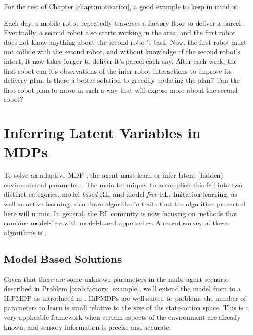     For the rest of Chapter \ref{chapt:motivation}, a good example to keep in mind is:
    \begin{problem}\label{prob:factory_example}
        Each day, a mobile robot repeatedly traverses a factory floor to deliver a parcel. Eventually, a second robot
        also starts working in the area, and the first robot does not know anything about the second robot's task. Now,
        the first robot must not collide with the second robot, and without knowledge of the second robot's intent, it
        now takes longer to deliver it's parcel each day. After each week, the first robot can it's observations of the
        inter-robot interactions to improve its delivery plan. Is there a better solution to greedily updating the plan?
        Can the first robot plan to move in such a way that will expose more about the second robot?
    \end{problem}

\section{Inferring Latent Variables in MDPs}\label{sec:literature_hipmdp}

        To solve an adaptive \ac{MDP} \cite{hernandez2012adaptive}, the agent must learn or infer latent (hidden)
        environmental parameters. The main techniques to accomplish this fall into two distinct categories,
        model-\textit{based} \ac{RL}, and model-\textit{free} \ac{RL}. Imitation learning, as well as active learning,
        also share algorithmic traits that the algorithm presented here will mimic. In general, the \ac{RL} comunity is
        now focusing on methods that combine model-free with model-based approaches. A recent survey of these algorithms
        is \cite{polydoros2017survey}.

\subsection{Model Based Solutions}\label{sec:model_based_lit}

    Given that there are some unknown parameters in the multi-agent scenario described in Problem
    \ref{prob:factory_example}, we'll extend the model from  to a \ac{HiPMDP} as introduced in
    \cite{doshi2016hidden}. \ac{HiPMDP}s are well suited to problems the number of parameters to learn is small relative
    to the size of the state-action space. This is a very applicable framework when certain aspects of the environment
    are already known, and sensory information is precise and accurate.

